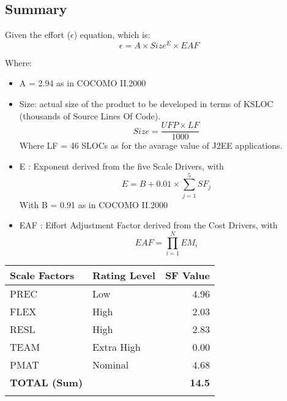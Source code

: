    \subsection{Summary}
    Given the effort ($\epsilon$) equation, which is:
    \begin{equation}
        \epsilon = A \times Size^E \times EAF
    \end{equation}
    
    Where:
    \begin{itemize}
        \item A = 2.94 as in COCOMO II.2000
        \item Size: actual size of the product to be developed in terms of KSLOC (thousands of Source Lines Of Code).
        \begin{equation}
            Size = \frac{UFP \times LF}{1000}
        \end{equation}
        Where LF = 46 SLOCs as for the avarage value of J2EE applications.
        
        \item E : Exponent derived from the five Scale Drivers, with
        \begin{equation}
            E = B + 0.01 \times \sum_{j=1}^5 SF_j
        \end{equation}
        With B = 0.91 as in COCOMO II.2000
        \item EAF : Effort Adjustment Factor derived from the Cost Drivers, with
        \begin{equation}
            EAF = \prod_{i=1}^N EM_i
        \end{equation}
    \end{itemize}
    
    
 {\renewcommand{\arraystretch}{1.5}

\begin{tabularx}{\textwidth}{X  X r}
    \hline 
    \textbf{Scale Factors} & \textbf{Rating Level} &\textbf{SF Value}\\ 
    \hline 
    PREC & Low & 4.96\\
    \hline 
    FLEX & High & 2.03\\
    \hline
    RESL & High & 2.83\\
    \hline
    TEAM & Extra High & 0.00\\
    \hline
    PMAT & Nominal & 4.68\\
    \hline
    \textbf{TOTAL (Sum)} &  & \textbf{14.5}\\
    \hline
    \caption{Scale Drivers Recap}\label{tab:sf-summary}\\
\end{tabularx}}


